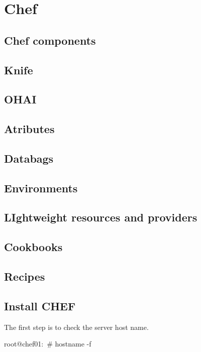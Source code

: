 \chapter{Chef}

\section{Chef components}

\section{Knife}

\section{OHAI}

\section{Atributes}

\section{Databags}

\section{Environments}

\section{LIghtweight resources and providers}

\section{Cookbooks}

\section{Recipes}

\section{Install CHEF}

The first step is to check the server host name.

\begin{codelisting}
\label{code:hostname}
\codecaption{}
\begin{code}
root@chef01:~# hostname -f
\end{code}
\end{codelisting}

